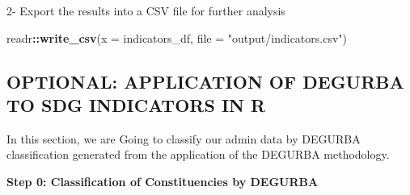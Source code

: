 \documentclass[
]{article}
\newenvironment{Shaded}{\begin{snugshade}}{\end{snugshade}}
\newcommand{\AttributeTok}[1]{\textcolor[rgb]{0.13,0.29,0.53}{#1}}
\newcommand{\FunctionTok}[1]{\textcolor[rgb]{0.13,0.29,0.53}{\textbf{#1}}}
\newcommand{\NormalTok}[1]{#1}
\newcommand{\SpecialCharTok}[1]{\textcolor[rgb]{0.81,0.36,0.00}{\textbf{#1}}}
\newcommand{\StringTok}[1]{\textcolor[rgb]{0.31,0.60,0.02}{#1}}
\newenvironment{UNFPAShadedBox}{%
\begin{tcolorbox}[sharp corners, enhanced, colback=white, boxrule=0pt, borderline west={2pt}{0pt}{orange}]%
}{\end{tcolorbox}}
\newenvironment{Highlighting}{\begin{UNFPAShadedBox}}{\end{UNFPAShadedBox}}
\begin{document}
2- Export the results into a CSV file for further analysis

\begin{Shaded}
\begin{Highlighting}[]
\NormalTok{readr}\SpecialCharTok{::}\FunctionTok{write\_csv}\NormalTok{(}\AttributeTok{x =}\NormalTok{ indicators\_df, }\AttributeTok{file =} \StringTok{"output/indicators.csv"}\NormalTok{)}
\end{Highlighting}
\end{Shaded}

\subsection{OPTIONAL: APPLICATION OF DEGURBA TO SDG INDICATORS IN
R}\label{optional-application-of-degurba-to-sdg-indicators-in-r}

In this section, we are Going to classify our admin data by DEGURBA
classification generated from the application of the DEGURBA
methodology.

\textbf{Step 0: Classification of Constituencies by DEGURBA}
\end{document}
